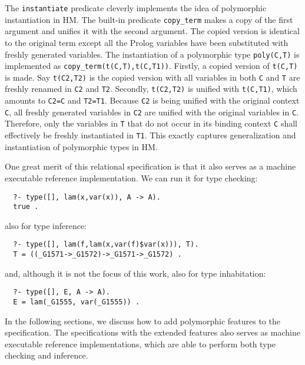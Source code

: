 \documentclass[runningheads,a4paper]{llncs}
\begin{document}
The {\small\verb|instantiate|} predicate
cleverly implements the idea of polymorphic instantiation in HM.
The built-in predicate {\small\verb|copy_term|} makes a copy of
the first argument and unifies it with the second argument. The copied version
is identical to the original term except all the Prolog variables have been
substituted with freshly generated variables. The instantiation of a polymorphic
type {\small\verb|poly(C,T)|} is implemented as
{\small\verb|copy_term(t(C,T),t(C,T1))|}.
Firstly, a copied version of {\small\verb|t(C,T)|} is made.
Say {\small\verb|t(C2,T2)|} is the copied version with all variables
in both {\small\verb|C|} and {\small\verb|T|}
are freshly renamed in {\small\verb|C2|} and {\small\verb|T2|}.
Secondly, {\small\verb|t(C2,T2)|}
is unified with {\small\verb|t(C,T1)|}, which amounts to {\small\verb|C2=C|}
and {\small\verb|T2=T1|}. Because {\small\verb|C2|} is being unified with
the original context {\small\verb|C|}, all freshly generated variables in
{\small\verb|C2|} are unified with the original variables in \verb|C|.
Therefore, only the variables in {\small\verb|T|} that do not occur in its
binding context {\small\verb|C|} shall effectively be freshly instantiated in 
{\small\verb|T1|}. This exactly captures generalization and instantiation of
polymorphic types in HM.

One great merit of this relational specification is that it also serves as
a machine executable reference implementation. We can run it
for type checking: {\small \vspace*{-1ex}
\begin{verbatim}
  ?- type([], lam(x,var(x)), A -> A).         
  true .
\end{verbatim} \vspace*{-.7ex} }\noindent
also for type inference: {\small \vspace*{-1ex}
\begin{verbatim}
  ?- type([], lam(f,lam(x,var(f)$var(x))), T).
  T = ((_G1571->_G1572)->_G1571->_G1572) .
\end{verbatim} \vspace*{-.7ex} }\noindent
and, although it is not the focus of this work,
also for type inhabitation: {\small \vspace*{-1ex}
\begin{verbatim}
  ?- type([], E, A -> A).
  E = lam(_G1555, var(_G1555)) .
\end{verbatim} \vspace*{-.7ex} }

In the following sections, we discuss how to add polymorphic features
to the specification. The specifications with the extended features
also serves as machine executable reference implementations, which
are able to perform both type checking and inference.
\end{document}
